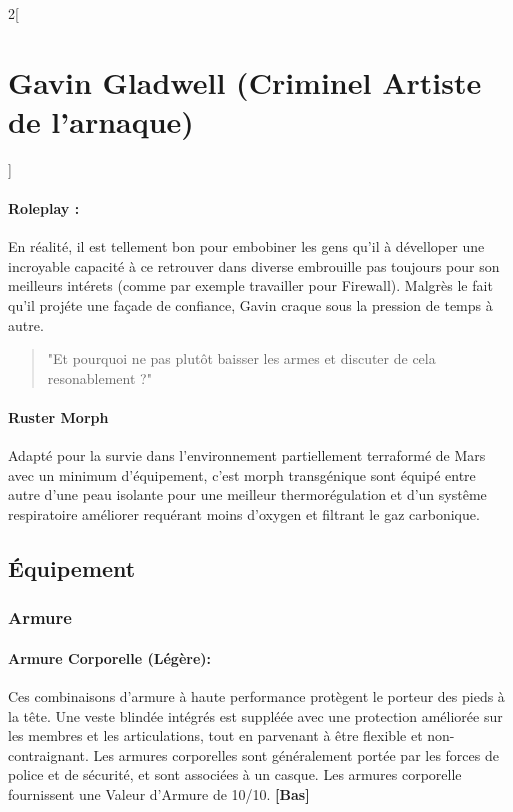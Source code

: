 \documentclass[a4paper,9pt]{article}
\begin{document}
\begin{multicols}{2}[\section*{Gavin Gladwell (Criminel Artiste de l'arnaque)}]
   \paragraph{Roleplay :}
   En réalité, il est tellement bon pour embobiner les gens qu'il à dévelloper
   une incroyable capacité à ce retrouver dans diverse embrouille pas toujours
   pour son meilleurs intérets (comme par exemple travailler pour Firewall).
   Malgrès le fait qu'il projéte une façade de confiance, Gavin craque sous
   la pression de temps à autre.

   \begin{quote}
      "Et pourquoi ne pas plutôt baisser les armes et discuter de cela
      resonablement ?"
   \end{quote}

   \paragraph{Ruster Morph}
   Adapté pour la survie dans l'environnement partiellement terraformé de Mars
   avec un minimum d'équipement, c'est morph transgénique sont équipé entre autre
   d'une peau isolante pour une meilleur thermorégulation et d'un systême
   respiratoire améliorer requérant moins d'oxygen et filtrant le gaz
   carbonique. 

   \subsection*{Équipement}

   \subsubsection*{Armure}

\paragraph{Armure Corporelle (Légère):} Ces combinaisons d'armure à haute
performance protègent le porteur des pieds à la tête. Une veste blindée
intégrés est suppléée avec une protection améliorée sur les membres et les
articulations, tout en parvenant à être flexible et non-contraignant. Les
armures corporelles sont généralement portée par les forces de police et de
sécurité, et sont associées à un casque. Les armures corporelle fournissent
une Valeur d'Armure de 10/10. \textbf{[Bas]} 


\end{multicols}
\end{document}
